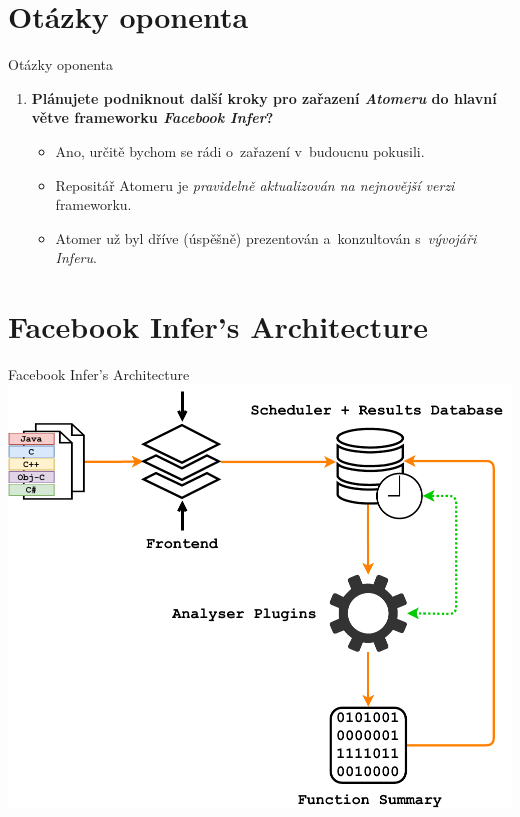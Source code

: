 \documentclass[10pt, xcolor=pdflatex, hyperref={unicode}, aspectratio=169]{beamer}
\begin{document}


\appendix




\section{Otázky oponenta}
\begin{frame}{Otázky oponenta}
    \begin{enumerate}
        \item \textbf{Plánujete podniknout další kroky pro zařazení \emph{Atomeru} do \alert{hlavní větve} frameworku \emph{Facebook Infer}?}
            \bigskip
            \begin{itemize}\setlength\itemsep{1.5em}
                \item \alert{Ano}, určitě bychom se rádi o~zařazení v~budoucnu pokusili. 

                \item Repositář Atomeru je \emph{pravidelně aktualizován na nejnovější verzi} frameworku.

                \item Atomer už byl dříve (úspěšně) \alert{prezentován} a~\alert{konzultován} s~\emph{vývojáři Inferu}.
            \end{itemize}
    \end{enumerate}
\end{frame}




\section{Facebook Infer's Architecture}
\begin{frame}{Facebook Infer's Architecture}
    \centering
    \includegraphics[width=.65 \linewidth]{infer-architecture.pdf}
\end{frame}
\end{document}
